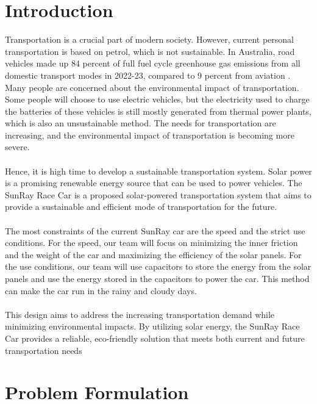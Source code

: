 \documentclass[12pt]{article}
\begin{document}
\tableofcontents
\newpage

\section{Introduction}
Transportation is a crucial part of modern society. 
However, current personal transportation is based on petrol, which is not sustainable. 
In Australia, road vehicles made up 84 percent of full fuel cycle greenhouse gas emissions from all domestic transport modes in 2022-23,
compared to 9 percent from aviation \cite{BITRE2023}. 
\newline
\\
Many people are concerned about the environmental impact of transportation.
Some people will choose to use electric vehicles, but the electricity used to charge the batteries of these vehicles is still mostly generated from thermal power plants, 
which is also an unsustainable method. The needs for transportation are increasing, and the environmental impact of transportation is becoming more severe.
\\
\\
Hence, it is high time to develop a sustainable transportation system.
Solar power is a promising renewable energy source that can be used to power vehicles. 
The SunRay Race Car is a proposed solar-powered transportation system that aims to provide a sustainable and efficient mode of transportation for the future.
\\
\\
The most constraints of the current SunRay car are the speed and the strict use conditions. For the speed, our team will focus on minimizing the inner friction and the weight of the car and
maximizing the efficiency of the solar panels. For the use conditions, our team will use capacitors to store the energy from the solar panels and use the energy stored in the capacitors to power the car.
This method can make the car run in the rainy and cloudy days.
\\
\\
This design aims to address the increasing transportation demand while minimizing environmental impacts. 
By utilizing solar energy, the SunRay Race Car provides a reliable, eco-friendly solution that meets both current and future transportation needs

\section{Problem Formulation}
\end{document}
